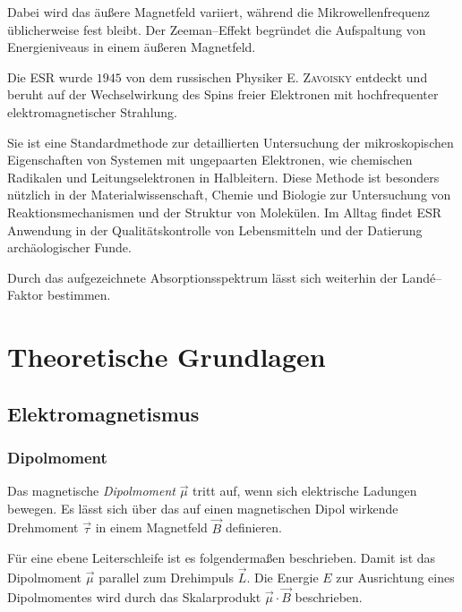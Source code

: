\documentclass[12pt,a4paper]{scrartcl}
\numberwithin{equation}{section} %
\begin{document}
Dabei wird das äußere Magnetfeld variiert, während die Mikrowellenfrequenz üblicherweise fest bleibt. \cite{Uni} Der Zeeman--Effekt begründet die Aufspaltung von Energieniveaus in einem äußeren Magnetfeld.

Die ESR wurde $1945$ von dem russischen Physiker \textsc{E. Zavoisky} entdeckt und beruht auf der Wechselwirkung des Spins freier Elektronen mit hochfrequenter elektromagnetischer Strahlung. \cite{Uni}

Sie ist eine Standardmethode zur detaillierten Untersuchung der mikroskopischen Eigenschaften von Systemen mit ungepaarten Elektronen, wie chemischen Radikalen und Leitungselektronen in Halbleitern. Diese Methode ist besonders nützlich in der Materialwissenschaft, Chemie und Biologie zur Untersuchung von Reaktionsmechanismen und der Struktur von Molekülen. Im Alltag findet ESR Anwendung in der Qualitätskontrolle von Lebensmitteln und der Datierung archäologischer Funde. \cite{Uni}

Durch das aufgezeichnete Absorptionsspektrum lässt sich weiterhin der Landé--Faktor bestimmen.

\clearpage
\hypertarget{theoretische-grundlagen}{\section{Theoretische Grundlagen}\label{theoretische-grundlagen}}

\hypertarget{elektromagnetismus}{\subsection{Elektromagnetismus}\label{elektromagnetismus}}

\hypertarget{dipolmoment}{\subsubsection{Dipolmoment}\label{dipolmoment}}

Das magnetische \emph{Dipolmoment} $\vec \mu$ tritt auf, wenn sich elektrische Ladungen bewegen. Es lässt sich über das auf einen magnetischen Dipol wirkende Drehmoment $\vec \tau$ in einem Magnetfeld $\vec B$ definieren.

Für eine ebene Leiterschleife ist es folgendermaßen beschrieben. \cite{Jackson} Damit ist das Dipolmoment $\vec \mu$ parallel zum Drehimpuls $\vec{L}$. Die Energie $E$ zur Ausrichtung eines Dipolmomentes wird durch das Skalarprodukt $\vec \mu \cdot \vec B$ beschrieben.
\end{document}
